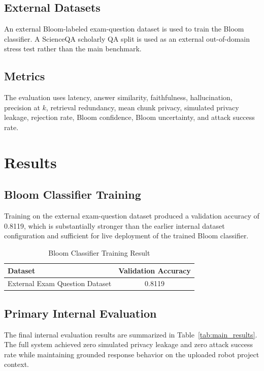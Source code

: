 \documentclass[conference]{IEEEtran}
\begin{document}
\subsection{External Datasets}
An external Bloom-labeled exam-question dataset is used to train the Bloom classifier. A ScienceQA scholarly QA split is used as an external out-of-domain stress test rather than the main benchmark.

\subsection{Metrics}
The evaluation uses latency, answer similarity, faithfulness, hallucination, precision at $k$, retrieval redundancy, mean chunk privacy, simulated privacy leakage, rejection rate, Bloom confidence, Bloom uncertainty, and attack success rate.

\section{Results}
\subsection{Bloom Classifier Training}
Training on the external exam-question dataset produced a validation accuracy of 0.8119, which is substantially stronger than the earlier internal dataset configuration and sufficient for live deployment of the trained Bloom classifier.

\begin{table}[t]
\caption{Bloom Classifier Training Result}
\centering
\begin{tabular}{lc}
\toprule
Dataset & Validation Accuracy \\
\midrule
External Exam Question Dataset & 0.8119 \\
\bottomrule
\end{tabular}
\end{table}

\subsection{Primary Internal Evaluation}
The final internal evaluation results are summarized in Table~\ref{tab:main_results}. The full system achieved zero simulated privacy leakage and zero attack success rate while maintaining grounded response behavior on the uploaded robot project context.
\end{document}
